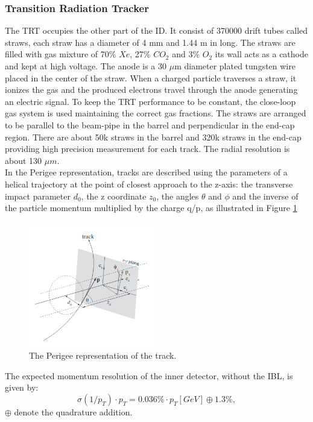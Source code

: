 \subsubsection{Transition Radiation Tracker}
The TRT occupies the other part of the ID. It consist of 370000 drift tubes called straws, each straw has a diameter of 4 mm and 1.44 m in long. The straws are filled with gas mixture of 70\% $Xe$, 27\% $CO_2$ and 3\% $O_2$ its wall acts as a cathode and kept at high voltage. The anode is a 30 $\mu$m diameter plated tungsten wire placed in the center of the straw. When a charged particle traverses a straw, it ionizes the gas and the produced electrons travel through the anode generating an electric signal. To keep the TRT performance to be constant, the close-loop gas system is used maintaining the correct gas fractions. The straws are arranged to be parallel to the beam-pipe in the barrel and perpendicular in the end-cap region. There are about 50k straws in the barrel and 320k straws in the end-cap providing high precision measurement for each track. The radial resolution is about 130 $\mu m$. \\
In the Perigee representation, tracks are described using the parameters of a helical trajectory at the point of closest approach to the z-axis: the transverse impact parameter $d_0$, the z coordinate $z_0$, the angles $\theta$ and $\phi$ and the inverse of the particle momentum multiplied by the charge q/p, as illustrated in Figure \ref{fig:chap2:ATLAS:ITK:Trk}
\begin{figure}[ht]
    \centering
    \includegraphics[width=0.5\textwidth]{Ch2/Img/Track.png}
    \caption{The Perigee representation of the track.}
    \label{fig:chap2:ATLAS:ITK:Trk}
\end{figure}
The expected momentum resolution of the inner detector, without the IBL, is given by:
\begin{equation}
    \sigma(1/p_T)\cdot p_T = 0.036\%\cdot p_T [GeV] \oplus 1.3\%,
\end{equation}
$\oplus$ denote the quadrature addition.
